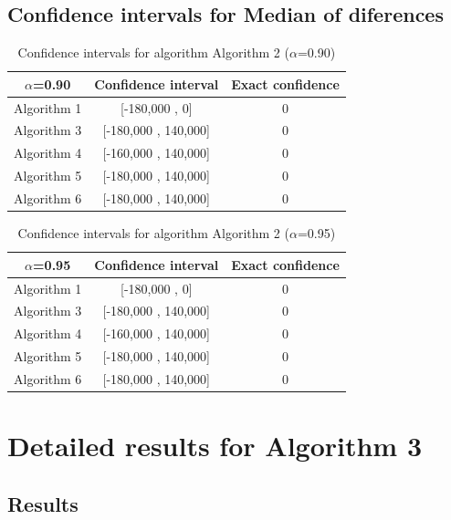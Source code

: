 \documentclass[a4paper,10pt]{article}
\begin{document}
\subsection{Confidence intervals for Median of diferences}

\begin{table}[!htp]
\centering\small
\begin{tabular}{
|c|c|c|}
\hline
 $\alpha$=0.90 & Confidence interval & Exact confidence \\ \hline 
Algorithm 1 & [-180,000 , 0] & 0\\ \hline 
Algorithm 3 & [-180,000 , 140,000] & 0\\ \hline 
Algorithm 4 & [-160,000 , 140,000] & 0\\ \hline 
Algorithm 5 & [-180,000 , 140,000] & 0\\ \hline 
Algorithm 6 & [-180,000 , 140,000] & 0\\ \hline 

\end{tabular}
\caption{Confidence intervals for algorithm Algorithm 2 ($\alpha$=0.90)}
\end{table}
\begin{table}[!htp]
\centering\small
\begin{tabular}{
|c|c|c|}
\hline
 $\alpha$=0.95 & Confidence interval & Exact confidence \\ \hline 
Algorithm 1 & [-180,000 , 0] & 0\\ \hline 
Algorithm 3 & [-180,000 , 140,000] & 0\\ \hline 
Algorithm 4 & [-160,000 , 140,000] & 0\\ \hline 
Algorithm 5 & [-180,000 , 140,000] & 0\\ \hline 
Algorithm 6 & [-180,000 , 140,000] & 0\\ \hline 

\end{tabular}
\caption{Confidence intervals for algorithm Algorithm 2 ($\alpha$=0.95)}
\end{table}

 \clearpage 


\section{Detailed results for Algorithm 3}


\subsection{Results}
\end{document}
